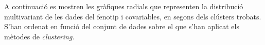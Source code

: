 \documentclass[CAT,BIB]{TFUOC}%
\begin{document}
        A continuació es mostren les gràfiques radials
        que representen la distribució multivariant
        de les dades del fenotip i covariables,
        en segons dels clústers trobats.
        S'han ordenat en funció del conjunt de dades
        sobre el que s'han aplicat els mètodes de \textit{clustering}.
%
%
%
%
%
%
%
\end{document}
